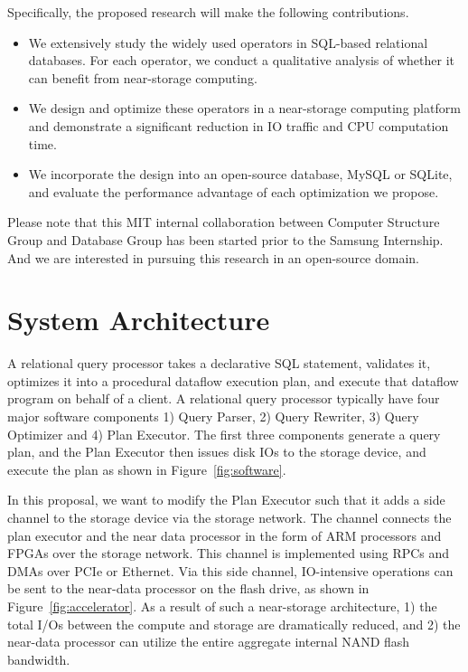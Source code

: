 \documentclass{article}
\begin{document}
Specifically, the proposed research will make the following contributions.

\begin{itemize}
\item We extensively study the widely used operators in SQL-based relational databases. For each operator, we conduct a qualitative analysis of whether it can benefit from near-storage computing. 

\item We design and optimize these operators in a near-storage computing platform and demonstrate a significant reduction in IO traffic and CPU computation time. 

\item We incorporate the design into an open-source database, MySQL or SQLite, and evaluate the performance advantage of each optimization we propose. 
\end{itemize}

Please note that this MIT internal collaboration between Computer Structure Group and Database Group has been started prior to the Samsung Internship. And we are interested in pursuing this research in an open-source domain.


\section{System Architecture}

A relational query processor takes a declarative SQL statement, validates it, optimizes it into a procedural dataflow execution plan, and execute that dataflow program on behalf of a client.
A relational query processor typically have four major software components 1) Query Parser, 2) Query Rewriter, 3) Query Optimizer and 4) Plan Executor.
The first three components generate a query plan, and the Plan Executor then issues disk IOs to the storage device, and execute the plan as shown in Figure~\ref{fig:software}.


In this proposal, we want to modify the Plan Executor such that it adds a side channel to the storage device via the storage network.
The channel connects the plan executor and the near data processor in the form of ARM processors and FPGAs over the storage network.
This channel is implemented using RPCs and DMAs over PCIe or Ethernet.
Via this side channel, IO-intensive operations can be sent to the near-data processor on the flash drive, as shown in Figure~\ref{fig:accelerator}.
As a result of such a near-storage architecture, 1) the total I/Os between the compute and storage are dramatically reduced, and 2) the near-data processor can utilize the entire aggregate internal NAND flash bandwidth.
\end{document}
